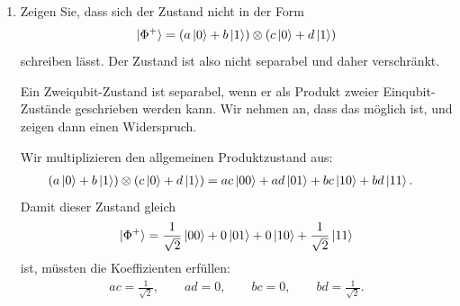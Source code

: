 \documentclass[11pt,a4paper]{scrartcl}
\begin{document}
\begin{enumerate}[label=(\alph*)]
        \item Zeigen Sie, dass sich der Zustand nicht in der Form
        \begin{align*}
            \ket{\Phi^+}
            =
            (a\ket{0}+b\ket{1})\otimes(c\ket{0}+d\ket{1})
        \end{align*}
        schreiben lässt. Der Zustand ist also nicht separabel und daher verschränkt.

        \begin{calculationbox}
            Ein Zweiqubit-Zustand ist separabel, wenn er als Produkt zweier Einqubit-Zustände geschrieben werden kann. Wir nehmen an, dass das möglich ist, und zeigen dann einen Widerspruch.

            \begin{calculationbox}[title=Allgemeiner separabler Zustand]
                Wir multiplizieren den allgemeinen Produktzustand aus:
                \begin{align*}
                    (a\ket{0}+b\ket{1})\otimes(c\ket{0}+d\ket{1})
                    &=
                    ac\ket{00}
                    +
                    ad\ket{01}
                    +
                    bc\ket{10}
                    +
                    bd\ket{11}.
                \end{align*}
                Damit dieser Zustand gleich
                \begin{align*}
                    \ket{\Phi^+}
                    =
                    \frac{1}{\sqrt2}\ket{00}
                    +
                    0\ket{01}
                    +
                    0\ket{10}
                    +
                    \frac{1}{\sqrt2}\ket{11}
                \end{align*}
                ist, müssten die Koeffizienten erfüllen:
                \begin{align*}
                    ac=\frac1{\sqrt2},
                    \qquad
                    ad=0,
                    \qquad
                    bc=0,
                    \qquad
                    bd=\frac1{\sqrt2}.
                \end{align*}
            \end{calculationbox}


\end{calculationbox}
\end{enumerate}
\end{document}
